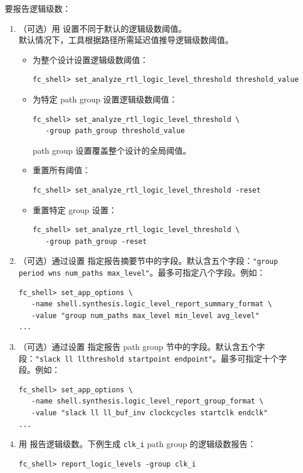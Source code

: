 要报告逻辑级数：
\begin{enumerate}
  \item （可选）用  设置不同于默认的逻辑级数阈值。\\
    默认情况下，工具根据路径所需延迟值推导逻辑级数阈值。
    \begin{itemize}
      \item 为整个设计设置逻辑级数阈值：
\begin{lstlisting}
fc_shell> set_analyze_rtl_logic_level_threshold threshold_value
\end{lstlisting}
      \item 为特定 path group 设置逻辑级数阈值：
\begin{lstlisting}
fc_shell> set_analyze_rtl_logic_level_threshold \
   -group path_group threshold_value
\end{lstlisting}
        path group 设置覆盖整个设计的全局阈值。
      \item 重置所有阈值：
\begin{lstlisting}
fc_shell> set_analyze_rtl_logic_level_threshold -reset
\end{lstlisting}
      \item 重置特定 group 设置：
\begin{lstlisting}
fc_shell> set_analyze_rtl_logic_level_threshold \
   -group path_group -reset
\end{lstlisting}
    \end{itemize}
  \item （可选）通过设置  指定报告摘要节中的字段。默认含五个字段：\texttt{"group period wns num\_paths max\_level"}。最多可指定八个字段。例如：
\begin{lstlisting}
fc_shell> set_app_options \
   -name shell.synthesis.logic_level_report_summary_format \
   -value "group num_paths max_level min_level avg_level"
...
\end{lstlisting}
  \item （可选）通过设置  指定报告 path group 节中的字段。默认含五个字段：\texttt{"slack ll llthreshold startpoint endpoint"}。最多可指定十个字段。例如：
\begin{lstlisting}
fc_shell> set_app_options \
   -name shell.synthesis.logic_level_report_group_format \
   -value "slack ll ll_buf_inv clockcycles startclk endclk"
...
\end{lstlisting}
  \item 用  报告逻辑级数。下例生成 \texttt{clk\_i} path group 的逻辑级数报告：
\begin{lstlisting}
fc_shell> report_logic_levels -group clk_i
\end{lstlisting}
\end{enumerate}

